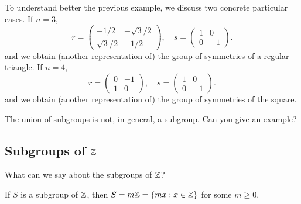 To understand better the previous example, 
we discuss two concrete particular cases. 
If $n=3$, 
\[
r=\begin{pmatrix}
-1/2 & -\sqrt{3}/2\\
\sqrt{3}/2 & -1/2
\end{pmatrix},
\quad
s=\begin{pmatrix}
        1 & 0\\
        0 & -1
\end{pmatrix}.
\]
and we obtain (another representation of) the group of symmetries of a regular 
triangle. 
If 
$n=4$, 
\[
r=\begin{pmatrix}
0 & -1\\
1 & 0
\end{pmatrix},
\quad
s=\begin{pmatrix}
        1 & 0\\
        0 & -1
\end{pmatrix}.
\]
and we obtain (another representation of) the group of symmetries of the square. 

\begin{exercise}
\label{xca:union}
        The union of subgroups is not, in general, 
        a subgroup. Can you give an example? 
\end{exercise}

\subsection{Subgroups of $\mathbb{Z}$}

What can we say about the subgroups of $\mathbb{Z}$? 

\begin{theorem}
        \label{thm:Z}
        If $S$ is a subgroup of $\mathbb{Z}$, then
                $S=m\mathbb{Z}=\{mx:x\in \mathbb{Z}\}$
                for some $m\geq0$.
        \end{theorem}
        
